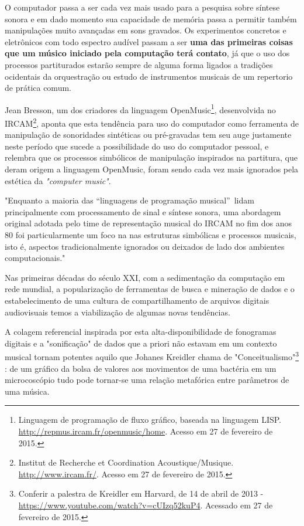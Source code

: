 \documentclass[
	12pt,				%
	openright,			%
	twoside,			%
	a4paper,			%
	english,			%
	french,				%
	spanish,			%
	brazil				%
	]{abntex2}
\begin{document}
O computador passa a ser cada vez mais usado para a pesquisa sobre síntese sonora e em dado momento sua capacidade de memória passa a permitir também manipulações muito avançadas em sons gravados. Os experimentos concretos e eletrônicos com todo espectro audível passam a ser \textbf{uma das primeiras coisas que um músico iniciado pela computação terá contato}, já que o uso dos processos partiturados estarão sempre de alguma forma ligados a tradições ocidentais da orquestração ou estudo de instrumentos musicais de um repertorio de prática comum.

Jean Bresson, um dos criadores da linguagem OpenMusic\footnote{Linguagem de programação de fluxo gráfico, baseada na linguagem LISP. \url{http://repmus.ircam.fr/openmusic/home}. Acesso em 27 de fevereiro de 2015.}, desenvolvida no IRCAM\footnote{Institut de Recherche et Coordination Acoustique/Musique. \url{http://www.ircam.fr/}. Acesso em 27 de fevereiro de 2015.}, aponta que esta tendência para uso do computador como ferramenta de manipulação de sonoridades sintéticas ou pré-gravadas tem seu auge justamente neste período que sucede a possibilidade do uso do computador pessoal, e relembra que os processos simbólicos de manipulação inspirados na partitura, que deram origem a linguagem OpenMusic, foram sendo cada vez mais ignorados pela estética da \textit{"computer music"}.


\begin{citacao}
"Enquanto a maioria das “linguagens de programação musical”\ lidam principalmente com processamento de sinal e síntese sonora, uma abordagem original adotada pelo time de representação musical do IRCAM no fim dos anos 80 foi particularmente um foco na nas estruturas simbólicas e processos musicais, isto é, aspectos tradicionalmente ignorados ou deixados de lado dos ambientes computacionais."\ \cite{bresson2011openmusic}
\end{citacao}

Nas primeiras décadas do século XXI, com a sedimentação da computação em rede mundial, a popularização de ferramentas de busca e mineração de dados e o estabelecimento de uma cultura de compartilhamento de arquivos digitais audiovisuais temos a viabilização de algumas novas tendências.

A colagem referencial inspirada por esta alta-disponibilidade de fonogramas digitais e a "sonificação" de dados que a priori não estavam em um contexto musical tornam potentes aquilo que Johanes Kreidler chama de "Conceitualismo"\footnote{Conferir a palestra de Kreidler em Harvard, de 14 de abril de 2013 - \url{https://www.youtube.com/watch?v=cUIzq52kuP4}. Acessado em 27 de fevereiro de 2015.} : de um gráfico da bolsa de valores aos movimentos de uma bactéria em um microcoscópio tudo pode tornar-se uma relação metafórica entre parâmetros de uma música.
\end{document}

